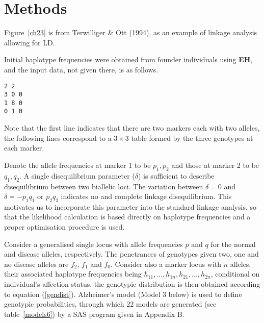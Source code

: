 \section{Methods}

Figure~\ref{ch23} is from Terwilliger \& Ott (1994), as an example of linkage
analysis allowing for LD.


Initial haplotype frequencies were obtained from founder individuals using {\bf
EH}, and the input data, not given there, is as follows.
\begin{verbatim}
2 2
3 0 0
1 8 0
0 1 0
\end{verbatim}
Note that the first line indicates that there are two markers each with two
alleles, the following lines correspond to a $3\times 3$ table formed by the
three genotypes at each marker.

Denote the allele frequencies at marker 1 to be $p_1, p_2$ and those at marker
2 to be $q_1, q_2$.  A single disequilibrium parameter ($\delta$) is sufficient
to describe disequilibrium between two biallelic loci.  The variation between
$\delta=0$ and $\delta=-p_1q_1$ or $p_2q_2$ indicates no and complete linkage
disequilibrium.  This motivates us to incorporate this parameter into the
standard linkage analysis, so that the likelihood calculation is based directly
on haplotype frequencies and a proper optimisation procedure is used.

Consider a generalised single locus with allele frequencies $p$ and $q$ for the
normal and disease alleles, respectively. The penetrances of genotypes given
two, one and no disease alleles are $f_2$, $f_1$ and $f_0$.  Consider also a
marker locus with $n$ alleles, their associated haplotype frequencies being
$h_{11},...,h_{1n}, h_{21},...,h_{2n}$, conditional on individual's affection
status, the genotypic distribution is then obtained according to equation
(\ref{gendist}).  Alzheimer's model (Model 3 below) is used to define genotypic
probabilities, through which 22 models are generated (see table~\ref{models6})
by a SAS program given in Appendix B.

